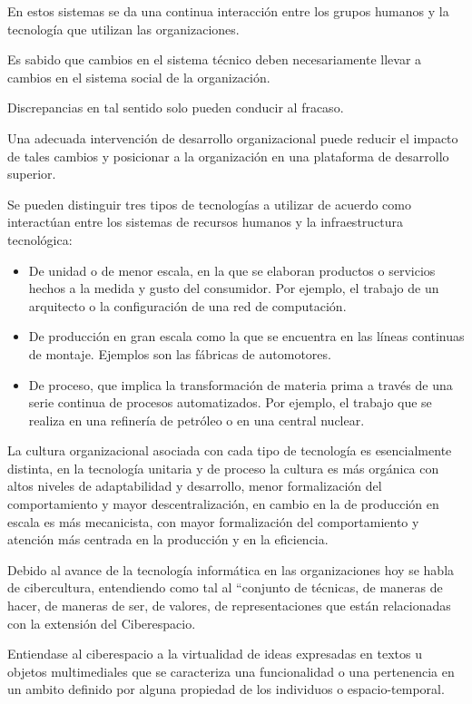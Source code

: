 \documentclass[a4paper, 12pt]{article}
\begin{document}
En estos sistemas se da una continua interacción entre los grupos humanos y la tecnología que utilizan las organizaciones. 

Es sabido que cambios en el sistema técnico deben necesariamente llevar a cambios en el sistema social de la organización. 

Discrepancias en tal sentido solo pueden conducir al fracaso. 

Una adecuada intervención de desarrollo organizacional puede reducir el impacto de tales cambios y posicionar a la organización en una plataforma de desarrollo superior.

Se pueden distinguir tres tipos de tecnologías a utilizar de acuerdo como interactúan entre los sistemas de recursos humanos y la infraestructura tecnológica:


\begin{itemize}
\item De unidad o de menor escala, en la que se elaboran productos o servicios hechos a la medida y gusto del consumidor. Por ejemplo, el trabajo de un arquitecto o la configuración de una red de computación.
\item De producción en gran escala como la que se encuentra en las líneas continuas de montaje. Ejemplos son las fábricas de automotores.
\item De proceso, que implica la transformación de materia prima a través de una serie continua de procesos automatizados. Por ejemplo, el trabajo que se realiza en una refinería de petróleo o en una central nuclear.
\end{itemize}

La cultura organizacional asociada con cada tipo de tecnología es esencialmente distinta, en la tecnología unitaria y de proceso la cultura es más orgánica con altos niveles de adaptabilidad y desarrollo, menor formalización del comportamiento y mayor descentralización, en cambio en la de producción en escala es más mecanicista, con mayor formalización del comportamiento y atención más centrada en la producción y en la eficiencia.

Debido al avance de la tecnología informática en las organizaciones hoy se habla de cibercultura, entendiendo como tal al “conjunto de técnicas, de maneras de hacer, de maneras de ser, de valores, de representaciones que están relacionadas con la extensión del Ciberespacio.

Entiendase al ciberespacio a la virtualidad de ideas expresadas en textos u objetos multimediales  que  se caracteriza una funcionalidad o una pertenencia en un ambito definido por alguna propiedad de los individuos o espacio-temporal.
\end{document}
